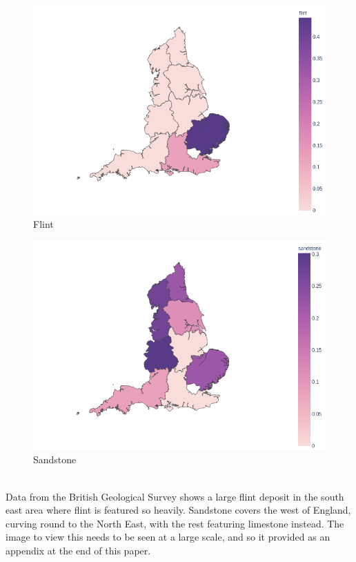 \documentclass[11pt]{article}
\begin{document}
\begin{minipage}{0.45\textwidth}
	\begin{figure}[H]
		\centering
		\includegraphics[width=\textwidth]{flint.png}
		\caption{Flint}
	\end{figure}
\end{minipage}
\begin{minipage}{0.45\textwidth}
	\begin{figure}[H]
		\centering
		\includegraphics[width=\textwidth]{sandstone.png}
		\caption{Sandstone}
	\end{figure}
\end{minipage}
\vspace{1cm}
\\
Data from the British Geological Survey shows a large flint deposit in the south east area where flint is featured so heavily. Sandstone covers the west of England, curving round to the North East, with the rest featuring limestone instead. The image to view this needs to be seen at a large scale, and so it provided as an appendix at the end of this paper.
\end{document}
